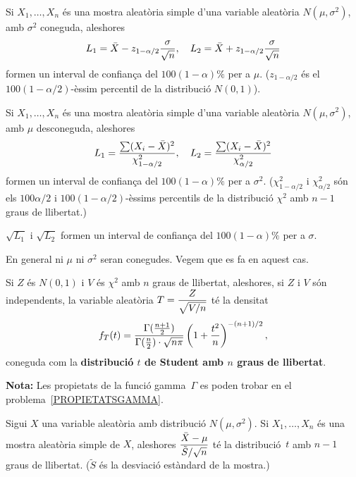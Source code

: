 \begin{proposition}
Si $X_1, \ldots , X_n$ \'es una mostra aleat\`oria simple d'una
variable alea\-t\`oria $N(\mu,\sigma^2)$, amb $\sigma^2$ coneguda, aleshores
$$L_1 = \bar{X} - z_{1-\alpha/2} {\sigma \over \sqrt{n}}, \ \ \ L_2 = \bar{X} +
z_{1-\alpha/2} {\sigma \over \sqrt{n}}$$
formen un interval de confian\c{c}a del $100(1-\alpha) \% $ per a $\mu$.
\newline
($z_{1-\alpha/2}$ \'es el $100(1-\alpha/2)$-\`essim percentil de la distribuci\'o
$N(0,1)$).
\end{proposition}

\begin{proposition}
Si $X_1, \ldots , X_n$ \'es una mostra aleat\`oria simple d'una
variable alea\-t\`oria $N(\mu,\sigma^2)$, amb $\mu$ desconeguda, aleshores
$$L_1 = {\sum (X_i - \bar{X})^2 \over \chi_{1-\alpha/2}^2}, \ \ \ L_2 = {\sum
(X_i - \bar{X})^2 \over \chi_{\alpha/2}^2}$$
formen un interval de confian\c ca del $100(1-\alpha)\%$ per a $\sigma^2$.
($\chi_{1-\alpha/2}^2$ i $\chi_{\alpha/2}^2$ s\'on els $100\alpha/2$ i
$100(1-\alpha/2)$-\`essims percentils de la distribuci\'o $\chi^2$ amb $n-1$ graus de
llibertat.)

$\sqrt{L_1}$ i $\sqrt{L_2}$ formen un interval de confian\c ca del $100(1-\alpha)\%$
per a $\sigma$.
\end{proposition}

En general ni $\mu$ ni $\sigma^2$ seran conegudes. 
Vegem que es fa en aquest cas.


\begin{proposition}
Si $Z$ \'es $N(0,1)$ i $V$ \'es $\chi^2$ amb $n$ graus de
llibertat, aleshores, si $Z$ i $V$ s\'on independents, la variable aleat\`oria
$\displaystyle T = {Z \over \sqrt{V/n}}$ t\'e la densitat
$$f_T(t) = {\Gamma({n+1 \over 2}) \over \Gamma({n \over 2}) \cdot \sqrt{n \pi}}
\left(1 + {t^2 \over n}\right)^{-(n+1)/2},$$
coneguda com la {\bf distribuci\'o $t$ de Student amb $n$ graus de llibertat}.
\end{proposition}

{\bf Nota:} Les propietats de la funci\'o gamma~$\Gamma$ es poden trobar en el
problema~\ref{PROPIETATSGAMMA}.

\begin{proposition}
Sigui $X$ una variable aleat\`oria amb distribuci\'o
$N(\mu,\sigma^2)$. Si \break $X_1, \ldots , X_n$ \'es una mostra aleat\`oria simple 
de $X$, aleshores $\displaystyle {\bar{X} - \mu \over \tilde{S}/\sqrt{n}}$ 
t\'e la distribuci\'o~$t$ amb $n-1$ graus de llibertat. 
($\tilde{S}$ \'es la desviaci\'o est\`andard de la mostra.)
\end{proposition}

